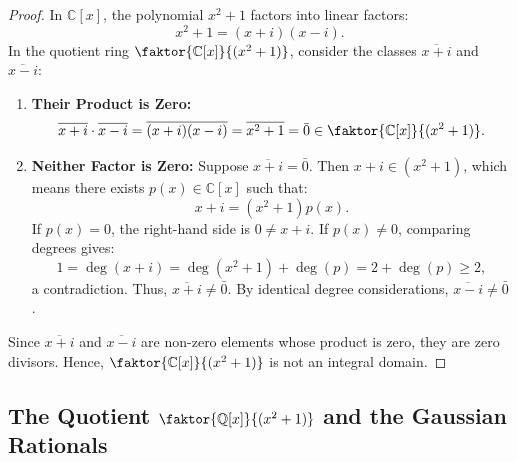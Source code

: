 \begin{content}

\begin{proof}
In $\mathbb{C}[x]$, the polynomial $x^2 + 1$ factors into linear factors:
\[
x^2 + 1 = (x + i)(x - i).
\]
In the quotient ring $\faktor{\mathbb{C}[x]}{(x^2 + 1)}$, consider the classes $\overline{x + i}$ and $\overline{x - i}$:
\begin{enumerate}[label=\textbf{(\arabic*)}]
    \item \textbf{Their Product is Zero:}
    \[
    \overline{x + i} \cdot \overline{x - i} = \overline{(x + i)(x - i)} = \overline{x^2 + 1} = \bar{0} \in \faktor{\mathbb{C}[x]}{(x^2 + 1)}.
    \]
    \item \textbf{Neither Factor is Zero:}
    Suppose $\overline{x + i} = \bar{0}$. Then $x + i \in (x^2 + 1)$, which means there exists $p(x) \in \mathbb{C}[x]$ such that:
    \[
    x + i = (x^2 + 1) p(x).
    \]
    If $p(x) = 0$, the right-hand side is $0 \neq x + i$. If $p(x) \neq 0$, comparing degrees gives:
    \[
    1 = \deg(x + i) = \deg(x^2 + 1) + \deg(p) = 2 + \deg(p) \ge 2,
    \]
    a contradiction. Thus, $\overline{x + i} \neq \bar{0}$. By identical degree considerations, $\overline{x - i} \neq \bar{0}$.
\end{enumerate}
Since $\overline{x + i}$ and $\overline{x - i}$ are non-zero elements whose product is zero, they are zero divisors. Hence, $\faktor{\mathbb{C}[x]}{(x^2 + 1)}$ is not an integral domain.
\end{proof}
\end{content}

\subsection{The Quotient \texorpdfstring{$\faktor{\mathbb{Q}[x]}{(x^2+1)}$}{Q[x]/(x\texttwosuperior+1)} and the Gaussian Rationals}

